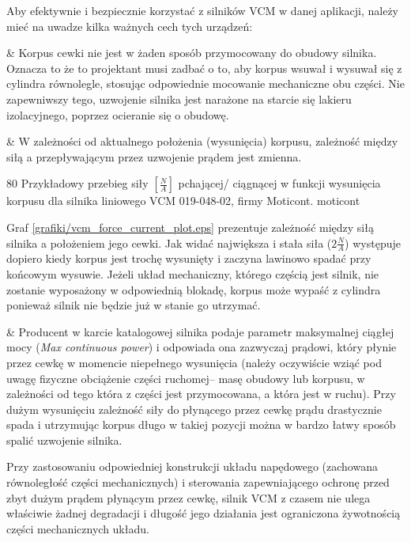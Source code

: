 Aby efektywnie i bezpiecznie korzystać z silników VCM w danej aplikacji, należy mieć na uwadze kilka ważnych cech tych urządzeń:

\begin{easylist}
	& Korpus cewki nie jest w żaden sposób przymocowany do obudowy silnika. Oznacza to że to projektant musi zadbać o to, aby korpus wsuwał i wysuwał się z cylindra równolegle, stosując odpowiednie mocowanie mechaniczne obu części. Nie zapewniwszy tego, uzwojenie silnika jest narażone na starcie się lakieru izolacyjnego, poprzez ocieranie się o obudowę. 
	
	& W zależności od aktualnego położenia (wysunięcia) korpusu, zależność między siłą a przepływającym przez uzwojenie prądem jest zmienna.
	
		{80}
		{Przykładowy przebieg siły $ [\frac{N}{A}] $ pchającej/ ciągnącej w funkcji wysunięcia korpusu dla silnika liniowego VCM 019-048-02, firmy Moticont.}
		{moticont}
	
Graf \ref{grafiki/vcm_force_current_plot.eps} prezentuje zależność między siłą silnika a położeniem jego cewki. Jak widać największa i stała siła ($ 2 \frac{N}{A} $) występuje dopiero kiedy korpus jest trochę wysunięty i zaczyna lawinowo spadać przy końcowym wysuwie. Jeżeli układ mechaniczny, którego częścią jest silnik, nie zostanie wyposażony w odpowiednią blokadę, korpus może wypaść z cylindra ponieważ silnik nie będzie już w stanie go utrzymać.

	& Producent w karcie katalogowej silnika podaje parametr maksymalnej ciągłej mocy ({\em Max continuous power}) i odpowiada ona zazwyczaj prądowi, który płynie przez cewkę w momencie niepełnego wysunięcia (należy oczywiście wziąć pod uwagę fizyczne obciążenie części ruchomej-- masę obudowy lub korpusu, w zależności od tego która z części jest przymocowana, a która jest w ruchu). Przy dużym wysunięciu zależność siły do płynącego przez cewkę prądu drastycznie spada i utrzymując korpus długo w takiej pozycji można w bardzo łatwy sposób spalić uzwojenie silnika. \\
	
\end{easylist}

Przy zastosowaniu odpowiedniej konstrukcji układu napędowego (zachowana równoległość części mechanicznych) i sterowania zapewniającego ochronę przed zbyt dużym prądem płynącym przez cewkę, silnik VCM z czasem nie ulega właściwie żadnej degradacji i długość jego działania jest ograniczona żywotnością części mechanicznych układu.









